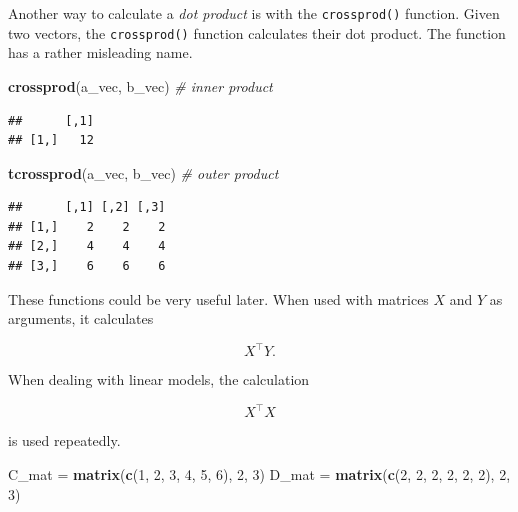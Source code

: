 \documentclass[]{book}
\newenvironment{Shaded}{\begin{snugshade}}{\end{snugshade}}
\newcommand{\KeywordTok}[1]{\textcolor[rgb]{0.13,0.29,0.53}{\textbf{#1}}}
\newcommand{\DecValTok}[1]{\textcolor[rgb]{0.00,0.00,0.81}{#1}}
\newcommand{\StringTok}[1]{\textcolor[rgb]{0.31,0.60,0.02}{#1}}
\newcommand{\CommentTok}[1]{\textcolor[rgb]{0.56,0.35,0.01}{\textit{#1}}}
\newcommand{\NormalTok}[1]{#1}
\theoremstyle{definition}
\theoremstyle{definition}
\theoremstyle{definition}
\theoremstyle{remark}
\begin{document}
Another way to calculate a \emph{dot product} is with the
\texttt{crossprod()} function. Given two vectors, the
\texttt{crossprod()} function calculates their dot product. The function
has a rather misleading name.

\begin{Shaded}
\begin{Highlighting}[]
\KeywordTok{crossprod}\NormalTok{(a_vec, b_vec)  }\CommentTok{# inner product}
\end{Highlighting}
\end{Shaded}

\begin{verbatim}
##      [,1]
## [1,]   12
\end{verbatim}

\begin{Shaded}
\begin{Highlighting}[]
\KeywordTok{tcrossprod}\NormalTok{(a_vec, b_vec)  }\CommentTok{# outer product}
\end{Highlighting}
\end{Shaded}

\begin{verbatim}
##      [,1] [,2] [,3]
## [1,]    2    2    2
## [2,]    4    4    4
## [3,]    6    6    6
\end{verbatim}

These functions could be very useful later. When used with matrices
\(X\) and \(Y\) as arguments, it calculates

\[
X^\top Y.
\]

When dealing with linear models, the calculation

\[
X^\top X
\]

is used repeatedly.

\begin{Shaded}
\begin{Highlighting}[]
\NormalTok{C_mat =}\StringTok{ }\KeywordTok{matrix}\NormalTok{(}\KeywordTok{c}\NormalTok{(}\DecValTok{1}\NormalTok{, }\DecValTok{2}\NormalTok{, }\DecValTok{3}\NormalTok{, }\DecValTok{4}\NormalTok{, }\DecValTok{5}\NormalTok{, }\DecValTok{6}\NormalTok{), }\DecValTok{2}\NormalTok{, }\DecValTok{3}\NormalTok{)}
\NormalTok{D_mat =}\StringTok{ }\KeywordTok{matrix}\NormalTok{(}\KeywordTok{c}\NormalTok{(}\DecValTok{2}\NormalTok{, }\DecValTok{2}\NormalTok{, }\DecValTok{2}\NormalTok{, }\DecValTok{2}\NormalTok{, }\DecValTok{2}\NormalTok{, }\DecValTok{2}\NormalTok{), }\DecValTok{2}\NormalTok{, }\DecValTok{3}\NormalTok{)}
\end{Highlighting}
\end{Shaded}
\end{document}
